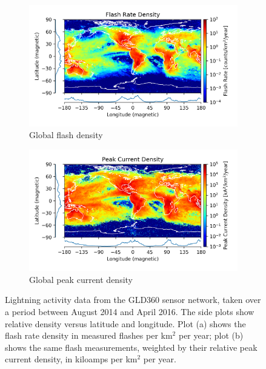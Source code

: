 \begin{figure}[t!]
\centering
\begin{subfigure}[Average global flash rate]{0.95\linewidth}
	\centering
	\includegraphics[width=\linewidth]{figures/flash_rate_density.png}
	\caption{Global flash density\label{fig:flash_rate_density}}
\end{subfigure}

\centering
\begin{subfigure}[Average global peak current rate]{0.95\linewidth}
	\centering
	\includegraphics[width=\linewidth]{figures/peak_current_density.png}
	\caption{Global peak current density \label{fig:peak_current_density}}
\end{subfigure}
\caption[Global lightning distributions, as measured by GLD360]{Lightning activity data from the GLD360 sensor network, taken over a period between August 2014 and April 2016. The side plots show relative density versus latitude and longitude. Plot (a) shows the flash rate density in measured flashes per km$^2$ per year; plot (b) shows the same flash measurements, weighted by their relative peak current density, in kiloamps per km$^2$ per year.}
\end{figure}
